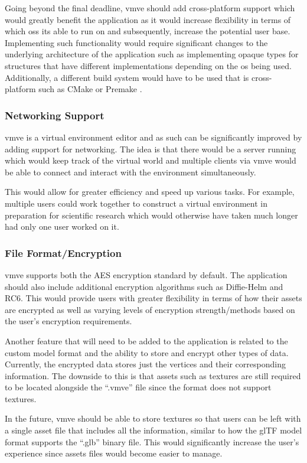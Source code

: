 \documentclass[11pt]{article}
\begin{document}
Going beyond the final deadline, \gls*{vmve} should add cross-platform support
which would greatly benefit the application as it would increase flexibility in
terms of which \glspl*{os} its able to run on and subsequently, increase the
potential user base. Implementing such functionality would require significant
changes to the underlying architecture of the application such as implementing
opaque types for structures that have different implementations depending on the
\gls*{os} being used. Additionally, a different build system would have to be
used that is cross-platform such as CMake \cite{cmake} or Premake \cite{premake}.

\subsubsection{Networking Support}
\gls*{vmve} is a virtual environment editor and as such can be significantly
improved by adding support for networking. The idea is that there would be a
server running which would keep track of the virtual world and multiple clients
via \gls*{vmve} would be able to connect and interact with the environment
simultaneously.

This would allow for greater efficiency and speed up various tasks. For example,
multiple users could work together to construct a virtual environment in
preparation for scientific research which would otherwise have taken much longer
had only one user worked on it.

\subsubsection{File Format/Encryption}
\gls*{vmve} supports both the AES encryption standard by default. The application
should also include additional encryption algorithms such as Diffie-Helm and
RC6. This would provide users with greater flexibility in terms of how their
assets are encrypted as well as varying levels of encryption strength/methods
based on the user's encryption requirements.

Another feature that will need to be added to the application is related to the
custom model format and the ability to store and encrypt other types of data.
Currently, the encrypted data stores just the vertices and their corresponding
information. The downside to this is that assets such as textures are still
required to be located alongside the ``.vmve'' file since the format does not
support textures.

In the future, \gls*{vmve} should be able to store textures so that users can be
left with a single asset file that includes all the information, similar to how
the glTF model format supports the ``.glb'' binary file. This would
significantly increase the user's experience since assets files would become
easier to manage.
\end{document}
